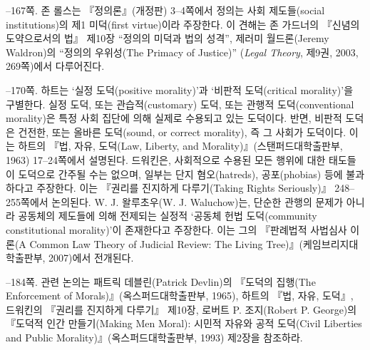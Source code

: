 {--167쪽.  존 롤스는 『정의론』(개정판)
3--4쪽에서 정의는 사회 제도들(social institutions)의 제1 미덕(first
virtue)이라 주장한다. 이 견해는 존 가드너의 『신념의 도약으로서의 법』
제10장 “정의의 미덕과 법의 성격”, 제러미 월드론(Jeremy Waldron)의
“정의의 우위성(The Primacy of Justice)” (\emph{Legal Theory}, 제9권,
2003, 269쪽)에서 다루어진다.

--170쪽.  하트는 ‘실정
도덕(positive morality)’과 ‘비판적 도덕(critical morality)’을 구별한다.
실정 도덕, 또는 관습적(customary) 도덕, 또는 관행적 도덕(conventional
morality)은 특정 사회 집단에 의해 실제로 수용되고 있는 도덕이다. 반면,
비판적 도덕은 건전한, 또는 올바른 도덕(sound, or correct morality), 즉
그 사회가  도덕이다. 이는 하트의
『법, 자유, 도덕(Law, Liberty, and Morality)』(스탠퍼드대학출판부, 1963)
17--24쪽에서 설명된다. 드워킨은, 사회적으로 수용된 모든 행위에 대한
태도들이 도덕으로 간주될 수는 없으며, 일부는 단지 혐오(hatreds),
공포(phobias) 등에 불과하다고 주장한다. 이는 『권리를 진지하게
다루기(Taking Rights Seriously)』 248--255쪽에서 논의된다. W. J.
왈루초우(W. J. Waluchow)는, 단순한 관행의 문제가 아니라 공동체의
제도들에 의해 전제되는 실정적 ‘공동체 헌법 도덕(community constitutional
morality)’이 존재한다고 주장한다. 이는 그의 『판례법적 사법심사 이론(A
Common Law Theory of Judicial Review: The Living
Tree)』(케임브리지대학출판부, 2007)에서 전개된다.

--184쪽.  관련 논의는 패트릭 데블린(Patrick Devlin)의 『도덕의 집행(The
Enforcement of Morals)』(옥스퍼드대학출판부, 1965), 하트의 『법, 자유,
도덕』, 드워킨의 『권리를 진지하게 다루기』 제10장, 로버트 P.
조지(Robert P. George)의 『도덕적 인간 만들기(Making Men Moral): 시민적
자유와 공적 도덕(Civil Liberties and Public
Morality)』(옥스퍼드대학출판부, 1993) 제2장을 참조하라.
}
